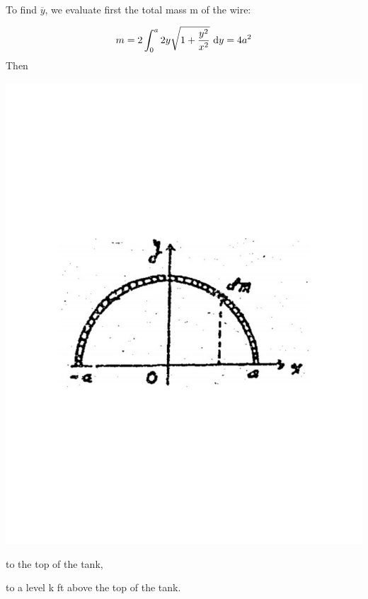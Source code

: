 \documentclass[11pt]{amsbook}
\begin{document}
	\paragraph{}To find $\overline{y}$, we evaluate first the total mass m of the wire:\\
	\begin{minipage}{0.55\textwidth}
	\begin{align*}
	    m = 2\int_{0}^{a} 2y\sqrt{1 + \frac{y^2}{x^2}} \ \mathrm{d}{y} = 4a^2 
	\end{align*}
	Then
	\end{minipage}
	\begin{minipage}{0.45\textwidth}
	\includegraphics[width=\textwidth]{images/b1p2-497-fig01}
	\end{minipage}
	
    \begin{hEnumerateAlpha}
        \item to the top of the tank, 
        \item to a level k ft above the top of the tank.
    \end{hEnumerateAlpha}
    
\end{document}
